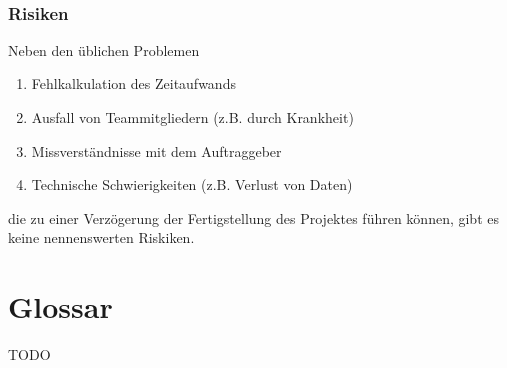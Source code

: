 \documentclass{article}
\begin{document}
	~\newpage
	\subsubsection{Risiken}
	Neben den üblichen Problemen
	\begin{enumerate}[--]
		\item{Fehlkalkulation des Zeitaufwands}
		\item{Ausfall von Teammitgliedern (z.B. durch Krankheit)}
		\item{Missverständnisse mit dem Auftraggeber}
		\item{Technische Schwierigkeiten (z.B. Verlust von Daten)}
	\end{enumerate}
	die zu einer Verzögerung der Fertigstellung des Projektes führen können, gibt es keine nennenswerten Riskiken.
	
	\section{Glossar}
	
	TODO
	
	\glsaddall
	\printglossaries
\end{document}
